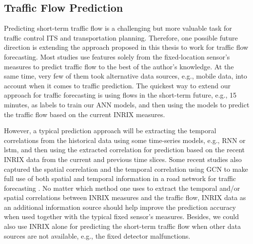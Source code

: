 \documentclass[english]{kththesis}
\begin{document}
\subsection{Traffic Flow Prediction}
Predicting short-term traffic flow is a challenging but more valuable task for traffic control ITS and transportation planning. Therefore, one possible future direction is extending the approach proposed in this thesis to work for traffic flow forecasting. Most studies use features solely from the fixed-location sensor's measures to predict traffic flow to the best of the author's knowledge. At the same time, very few of them took alternative data sources, e.g., mobile data, into account when it comes to traffic prediction. The quickest way to extend our approach for traffic forecasting is using flows in the short-term future, e.g., 15 minutes, as labels to train our ANN models, and then using the models to predict the traffic flow based on the current INRIX measures. 

However, a typical prediction approach will be extracting the temporal correlations from the historical data using some time-series models, e.g., RNN or \gls{lstm}, and then using the extracted correlation for prediction based on the recent INRIX data from the current and previous time slices. Some recent studies also captured the spatial correlation and the temporal correlation using GCN to make full use of both spatial and temporal information in a road network for traffic forecasting \cite{zhang_gcn_prediction}. No matter which method one uses to extract the temporal and/or spatial correlations between INRIX measures and the traffic flow, INRIX data as an additional information source should help improve the prediction accuracy when used together with the typical fixed sensor's measures. Besides, we could also use INRIX alone for predicting the short-term traffic flow when other data sources are not available, e.g., the fixed detector malfunctions.
\end{document}
